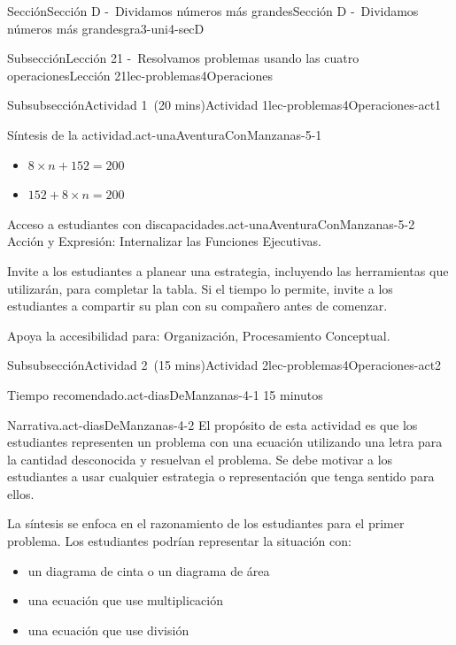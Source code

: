 \documentclass[oneside,10pt,]{article}
\begin{document}
\begin{sectionptx}{Sección}{Sección D -~Dividamos números más grandes}{}{Sección D -~Dividamos números más grandes}{}{}{gra3-uni4-secD}
\begin{subsectionptx}{Subsección}{Lección 21 -~Resolvamos problemas usando las cuatro operaciones}{}{Lección 21}{}{}{lec-problemas4Operaciones}
\begin{subsubsectionptx}{Subsubsección}{Actividad 1~(20 mins)}{}{Actividad 1}{}{}{lec-problemas4Operaciones-act1}
\begin{paragraphs}{Síntesis de la actividad.}{act-unaAventuraConManzanas-5-1}
\begin{itemize}[label=\textbullet]
\begin{itemize}[label=$\circ$]
\item{}\(\displaystyle 8 \times n + 152 = 200\)%
\item{}\(\displaystyle 152 + 8 \times n = 200\)%
\end{itemize}
\end{itemize}
\end{paragraphs}%
\begin{paragraphs}{Acceso a estudiantes con discapacidades.}{act-unaAventuraConManzanas-5-2}%
Acción y Expresión: Internalizar las Funciones Ejecutivas.%
\par
Invite a los estudiantes a planear una estrategia, incluyendo las herramientas que utilizarán, para completar la tabla. Si el tiempo lo permite, invite a los estudiantes a compartir su plan con su compañero antes de comenzar.%
\par
Apoya la accesibilidad para: Organización, Procesamiento Conceptual.%
\end{paragraphs}%
\end{subsubsectionptx}
%
%
\typeout{************************************************}
\typeout{************************************************}
%
\begin{subsubsectionptx}{Subsubsección}{Actividad 2~(15 mins)}{}{Actividad 2}{}{}{lec-problemas4Operaciones-act2}
\par
\begin{paragraphs}{Tiempo recomendado.}{act-diasDeManzanas-4-1}%
15 minutos%
\end{paragraphs}%
\begin{paragraphs}{Narrativa.}{act-diasDeManzanas-4-2}%
El propósito de esta actividad es que los estudiantes representen un problema con una ecuación utilizando una letra para la cantidad desconocida y resuelvan el problema. Se debe motivar a los estudiantes a usar cualquier estrategia o representación que tenga sentido para ellos.%
\par
La síntesis se enfoca en el razonamiento de los estudiantes para el primer problema. Los estudiantes podrían representar la situación con:%
%
\begin{itemize}[label=\textbullet]
\item{}un diagrama de cinta o un diagrama de área%
\item{}una ecuación que use multiplicación%
\item{}una ecuación que use división%
\end{itemize}

\end{paragraphs}
\end{subsubsectionptx}
\end{subsectionptx}
\end{sectionptx}
\end{document}
